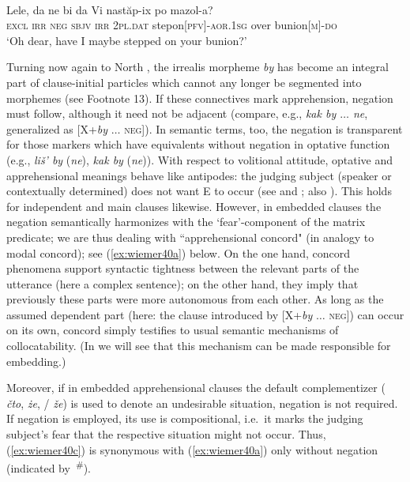 \documentclass[output=paper,colorlinks,citecolor=brown]{langscibook}
\begin{document}
\ea 
\label{ex:wiemer39} 
 \\
\gll Lele, da ne bi da Vi nastăp-ix po mazol-a? \\
\textsc{excl} \textsc{irr} \textsc{neg} \textsc{sbjv} \textsc{irr} \textsc{2pl.dat} step\textunderscore on\textsc{[pfv]-aor.1sg} over bunion\textsc{[m]-do} \\
\glt `Oh dear, have I maybe stepped on your bunion?' \\
\z



 Turning now again to North , the irrealis morpheme \textit{by} has become an integral part of clause-initial particles which cannot any longer be segmented into morphemes (see Footnote 13). If these connectives mark apprehension, negation must follow, although it need not be adjacent (compare, e.g.,  \textit{kak by $
\ldots$ ne}, generalized as [X+\textit{by} \textsc{$\ldots$ neg}]). In semantic terms, too, the negation is transparent for those markers which have equivalents without negation in optative function (e.g.,  \textit{liš' by} (\textit{ne}), \textit{kak by} (\textit{ne})). With respect to volitional attitude, optative and apprehensional meanings behave like antipodes: the judging subject (speaker or contextually determined) does not want E to occur (see  and ; also \citealt[343]{Dobrushina2016}). This holds for independent and main clauses likewise. However, in embedded clauses the negation semantically harmonizes with the `fear'-component of the matrix predicate; we are thus dealing with ``apprehensional concord" (in analogy to modal concord); see (\ref{ex:wiemer40a}) below. On the one hand, concord phenomena support syntactic tightness between the relevant parts of the utterance (here a complex sentence); on the other hand, they imply that previously these parts were more autonomous from each other. As long as the assumed dependent part (here: the clause introduced by [X+\textit{by} \textsc{$\ldots$ neg}]) can occur on its own, concord simply testifies to usual semantic mechanisms of collocatability. (In  we will see that this mechanism can be made responsible for embedding.)


Moreover, if in embedded apprehensional clauses the default complementizer ( \textit{čto},  \textit{że}, / \textit{že}) is used to denote an undesirable situation, negation is not required. If negation is employed, its use is compositional, i.e.\ it marks the judging subject's fear that the respective situation might not occur. Thus, (\ref{ex:wiemer40c}) is synonymous with (\ref{ex:wiemer40a}) only without negation (indicated by~\textsuperscript{\#}).
\end{document}
